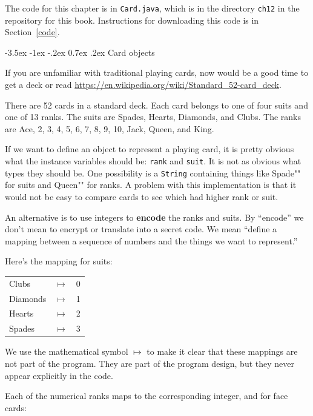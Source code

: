 \documentclass[12pt]{book}
\makeatletter
\theoremstyle{exercise}
\newcommand{\java}[1]{\verb"#1"}
\renewcommand{\section}{\@startsection{section}{1}{\z@}%
    {-3.5ex \@plus -1ex \@minus -.2ex}%
    {0.7ex \@plus.2ex}%
    {\normalfont\Large\bfseries}}
\newcommand{\java}[1]{\lstinline{#1}} %
\makeatother
\begin{document}
The code for this chapter is in \java{Card.java}, which is in the directory {\tt ch12} in the repository for this book.
Instructions for downloading this code is in Section~\ref{code}.


\section{Card objects}
\label{card}


If you are unfamiliar with traditional playing cards, now would be a good time to get a deck or read \url{https://en.wikipedia.org/wiki/Standard_52-card_deck}.


There are 52 cards in a standard deck.
Each card belongs to one of four suits and one of 13 ranks.
The suits are Spades, Hearts, Diamonds, and Clubs.
The ranks are Ace, 2, 3, 4, 5, 6, 7, 8, 9, 10, Jack, Queen, and King.

If we want to define an object to represent a playing card, it is pretty obvious what the instance variables should be: \java{rank} and \java{suit}.
It is not as obvious what types they should be.
One possibility is a \java{String} containing things like \java{"Spade"} for suits and \java{"Queen"} for ranks.
A problem with this implementation is that it would not be easy to compare cards to see which had higher rank or suit.


An alternative is to use integers to {\bf encode} the ranks and suits.
By ``encode'' we don't mean to encrypt or translate into a secret code.
We mean ``define a mapping between a sequence of numbers and the things we want to represent.''

Here's the mapping for suits:

\begin{tabular}{l c l}
Clubs & $\mapsto$ & 0 \\
Diamonds & $\mapsto$ & 1 \\
Hearts & $\mapsto$ & 2 \\
Spades & $\mapsto$ & 3
\end{tabular}

We use the mathematical symbol $\mapsto$ to make it clear that these mappings are not part of the program.
They are part of the program design, but they never appear explicitly in the code.

Each of the numerical ranks maps to the corresponding integer, and for face cards:
\end{document}
